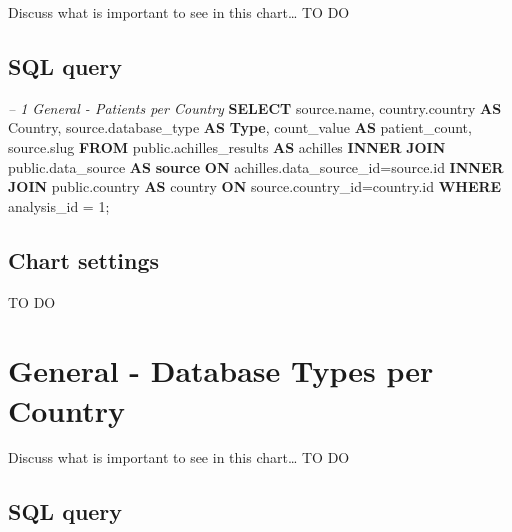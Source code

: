 \documentclass[]{book}
\newenvironment{Shaded}{\begin{snugshade}}{\end{snugshade}}
\newcommand{\KeywordTok}[1]{\textcolor[rgb]{0.13,0.29,0.53}{\textbf{#1}}}
\newcommand{\DecValTok}[1]{\textcolor[rgb]{0.00,0.00,0.81}{#1}}
\newcommand{\CommentTok}[1]{\textcolor[rgb]{0.56,0.35,0.01}{\textit{#1}}}
\newcommand{\NormalTok}[1]{#1}
\begin{document}
Discuss what is important to see in this chart\ldots{} TO DO

\subsection{SQL query}\label{sql-query-5}

\begin{Shaded}
\begin{Highlighting}[]
\CommentTok{-- 1    General - Patients per Country}
\KeywordTok{SELECT}\NormalTok{ source.name,}
\NormalTok{       country.country }\KeywordTok{AS}\NormalTok{ Country,}
\NormalTok{       source.database_type }\KeywordTok{AS} \KeywordTok{Type}\NormalTok{,}
\NormalTok{       count_value }\KeywordTok{AS}\NormalTok{ patient_count,}
\NormalTok{       source.slug}
\KeywordTok{FROM}\NormalTok{ public.achilles_results }\KeywordTok{AS}\NormalTok{ achilles }
    \KeywordTok{INNER} \KeywordTok{JOIN}\NormalTok{ public.data_source }\KeywordTok{AS} \KeywordTok{source} \KeywordTok{ON} 
\NormalTok{      achilles.data_source_id=source.id}
    \KeywordTok{INNER} \KeywordTok{JOIN}\NormalTok{ public.country }\KeywordTok{AS}\NormalTok{ country }\KeywordTok{ON} 
\NormalTok{      source.country_id=country.id}
\KeywordTok{WHERE}\NormalTok{ analysis_id = }\DecValTok{1}\NormalTok{;}
\end{Highlighting}
\end{Shaded}

\subsection{Chart settings}\label{chart-settings-5}

TO DO

\section{General - Database Types per
Country}\label{general---database-types-per-country}

Discuss what is important to see in this chart\ldots{} TO DO

\subsection{SQL query}\label{sql-query-6}
\end{document}
